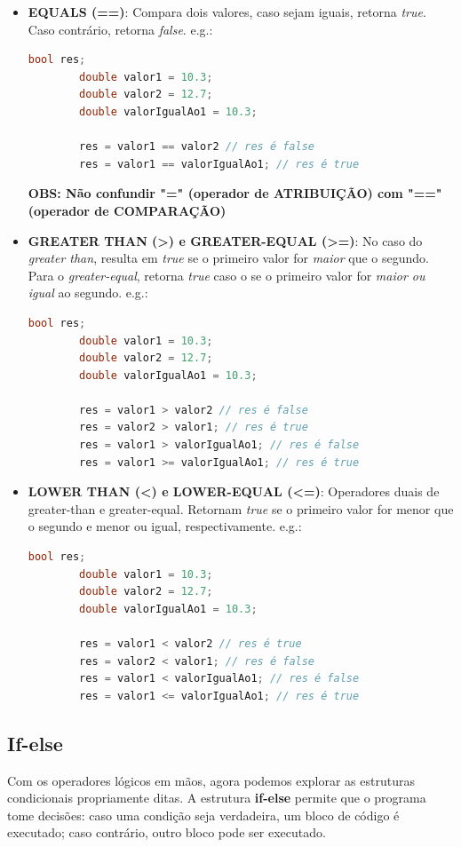 \documentclass[12pt]{article}
\begin{document}
\begin{itemize}
    \item \textbf{EQUALS (==)}: Compara dois valores, caso sejam iguais, retorna \textit{true}. Caso contrário, retorna \textit{false}. e.g.:
    \begin{lstlisting}[language=C++]
        bool res;
        double valor1 = 10.3;
        double valor2 = 12.7;
        double valorIgualAo1 = 10.3;

        res = valor1 == valor2 // res é false
        res = valor1 == valorIgualAo1; // res é true
    \end{lstlisting}
    \textbf{OBS: Não confundir "=" (operador de ATRIBUIÇÃO) com "==" (operador de COMPARAÇÃO)}
    \item \textbf{GREATER THAN (>) e GREATER-EQUAL (>=)}: No caso do \textit{greater than}, resulta em \textit{true} se o primeiro valor for \textit{maior} que o segundo. Para o \textit{greater-equal}, retorna \textit{true} caso o se o primeiro valor for \textit{maior ou igual} ao segundo. e.g.:
    \begin{lstlisting}[language=C++]
        bool res;
        double valor1 = 10.3;
        double valor2 = 12.7;
        double valorIgualAo1 = 10.3;

        res = valor1 > valor2 // res é false
        res = valor2 > valor1; // res é true
        res = valor1 > valorIgualAo1; // res é false
        res = valor1 >= valorIgualAo1; // res é true
    \end{lstlisting}
    \item \textbf{LOWER THAN (<) e LOWER-EQUAL (<=)}: Operadores duais de greater-than e greater-equal. Retornam \textit{true} se o primeiro valor for menor que o segundo e menor ou igual, respectivamente. e.g.:
    \begin{lstlisting}[language=C++]
        bool res;
        double valor1 = 10.3;
        double valor2 = 12.7;
        double valorIgualAo1 = 10.3;

        res = valor1 < valor2 // res é true
        res = valor2 < valor1; // res é false
        res = valor1 < valorIgualAo1; // res é false
        res = valor1 <= valorIgualAo1; // res é true
    \end{lstlisting}
\end{itemize}

\subsection{If-else}
Com os operadores lógicos em mãos, agora podemos explorar as estruturas condicionais propriamente ditas. A estrutura \textbf{if-else} permite que o programa tome decisões: caso uma condição seja verdadeira, um bloco de código é executado; caso contrário, outro bloco pode ser executado.
\end{document}
